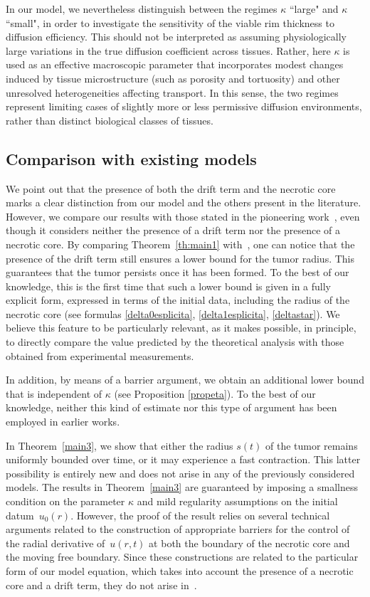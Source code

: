 \documentclass[12pt,a4paper,intlimits,sumlimits]{amsart}
\theoremstyle{definition}
\theoremstyle{plain}
\numberwithin{equation}{section}
\begin{document}
In our model, we nevertheless distinguish between the regimes $\kappa$ ``large" and $\kappa$ ``small", in order to investigate the sensitivity of the viable rim thickness to diffusion efficiency. This should not be interpreted as assuming physiologically large variations in the true diffusion coefficient across tissues. Rather,  here $\kappa$ is used as an effective macroscopic parameter that incorporates modest changes induced by tissue microstructure (such as porosity and tortuosity) and other unresolved heterogeneities affecting transport. In this sense, the two regimes represent limiting cases of slightly more or less permissive diffusion environments, rather than distinct biological classes of tissues.

\subsection{Comparison with existing models}
We point out that the presence of both the drift term and the necrotic core marks a clear distinction from our model and the others present in the literature. 
However, we compare our results with those stated in the pioneering work~\cite{MR1684873}, even though it considers neither the presence of a drift term nor the presence of a necrotic core.
By comparing Theorem~\ref{th:main1} with~\cite[Theorem~4.1]{MR1684873}, one can notice that the presence of the drift term still ensures a lower bound for the tumor radius. This guarantees that the tumor persists once it has been formed. To the best of our knowledge, this is the first time that such a lower bound is given in a fully explicit form, expressed in terms of the initial data, including the radius of the necrotic core (see formulas \eqref{delta0esplicita}, \eqref{delta1esplicita}, \eqref{deltastar}). We believe this feature to be particularly relevant, as it makes possible, in principle, to directly compare the value predicted by the theoretical analysis with those obtained from experimental measurements.

In addition, by means of a barrier argument, we obtain an additional lower bound that is independent of $\kappa$ (see Proposition \ref{propeta}). To the best of our knowledge, neither this kind of estimate nor this type of argument has been employed in earlier works.

In Theorem~\ref{main3}, we show that either the radius $s(t)$ of the tumor remains uniformly bounded over time, or it may experience a fast contraction. This latter possibility is entirely new and does not arise in any of the previously considered models.
The results in Theorem~\ref{main3} are guaranteed by imposing a smallness condition on the parameter $\kappa$ and mild regularity assumptions on the initial datum~$u_0(r)$. However,  the proof of the result relies on several technical arguments related to the construction of appropriate barriers for the control of the radial derivative of~$u(r,t)$ at both the boundary of the necrotic core and the moving free boundary.
Since these constructions are related to the particular form of our model equation, which takes into account the presence of a necrotic core and a drift term, they do not arise in~\cite[Theorem 5.1]{MR1684873}.
\end{document}
